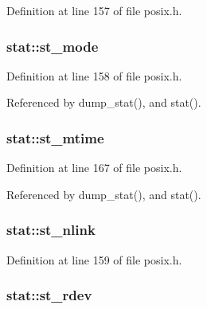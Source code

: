 Definition at line 157 of file posix.\-h.

\hypertarget{structstat_a5cbdd829011af82ba61e83773bbcbc7d}{
\subsubsection[{st\-\_\-mode}]{ stat\-::st\-\_\-mode}}\label{structstat_a5cbdd829011af82ba61e83773bbcbc7d}


Definition at line 158 of file posix.\-h.



Referenced by dump\-\_\-stat(), and stat().

\hypertarget{structstat_a77e235090f8cb6897f1c0ce65689006b}{
\subsubsection[{st\-\_\-mtime}]{ stat\-::st\-\_\-mtime}}\label{structstat_a77e235090f8cb6897f1c0ce65689006b}


Definition at line 167 of file posix.\-h.



Referenced by dump\-\_\-stat(), and stat().

\hypertarget{structstat_a0ed9092fa6c77a3251b9b9a4738ef84f}{
\subsubsection[{st\-\_\-nlink}]{ stat\-::st\-\_\-nlink}}\label{structstat_a0ed9092fa6c77a3251b9b9a4738ef84f}


Definition at line 159 of file posix.\-h.

\hypertarget{structstat_aa61e6c1a8a91c69f1d26f6700a0546cb}{
\subsubsection[{st\-\_\-rdev}]{ stat\-::st\-\_\-rdev}}\label{structstat_aa61e6c1a8a91c69f1d26f6700a0546cb}


